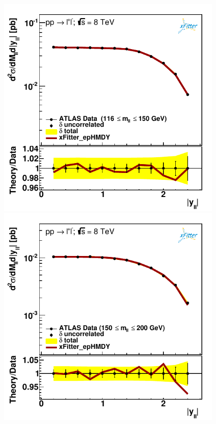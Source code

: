 \begin{figure}[t]
\centering
\includegraphics[width=14cm]{figs/data_401-1.pdf}\\
\includegraphics[width=14cm]{figs/data_402-1.pdf}

\end{figure}
